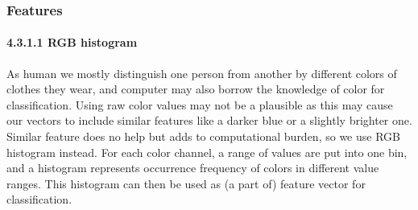 \documentclass{article}
\begin{document}
\subsubsection{Features}
\paragraph{4.3.1.1 RGB histogram}
As human we mostly distinguish one person from another by different colors of clothes they wear, and computer may also borrow the knowledge of color for classification.  Using raw color values may not be a plausible as this may cause our vectors to include similar features like a darker blue or a slightly brighter one. Similar feature does no help but adds to computational burden, so we use RGB histogram instead. For each color channel, a range of values are put into one bin, and a histogram represents occurrence frequency of colors in different value ranges. This histogram can then be used as (a part of) feature vector for classification.
\end{document}
